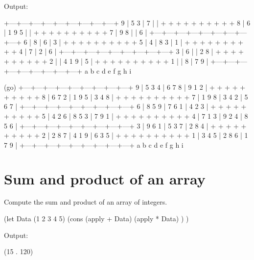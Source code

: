 \begin{wideverbatim}


Output:

   +---+---+---+---+---+---+---+---+---+
 9 | 5   3     |     7     |           |
   +   +   +   +   +   +   +   +   +   +
 8 | 6         | 1   9   5 |           |
   +   +   +   +   +   +   +   +   +   +
 7 |     9   8 |           |     6     |
   +---+---+---+---+---+---+---+---+---+
 6 | 8         |     6     |         3 |
   +   +   +   +   +   +   +   +   +   +
 5 | 4         | 8       3 |         1 |
   +   +   +   +   +   +   +   +   +   +
 4 | 7         |     2     |         6 |
   +---+---+---+---+---+---+---+---+---+
 3 |     6     |           | 2   8     |
   +   +   +   +   +   +   +   +   +   +
 2 |           | 4   1   9 |         5 |
   +   +   +   +   +   +   +   +   +   +
 1 |           |     8     |     7   9 |
   +---+---+---+---+---+---+---+---+---+
     a   b   c   d   e   f   g   h   i

(go)
   +---+---+---+---+---+---+---+---+---+
 9 | 5   3   4 | 6   7   8 | 9   1   2 |
   +   +   +   +   +   +   +   +   +   +
 8 | 6   7   2 | 1   9   5 | 3   4   8 |
   +   +   +   +   +   +   +   +   +   +
 7 | 1   9   8 | 3   4   2 | 5   6   7 |
   +---+---+---+---+---+---+---+---+---+
 6 | 8   5   9 | 7   6   1 | 4   2   3 |
   +   +   +   +   +   +   +   +   +   +
 5 | 4   2   6 | 8   5   3 | 7   9   1 |
   +   +   +   +   +   +   +   +   +   +
 4 | 7   1   3 | 9   2   4 | 8   5   6 |
   +---+---+---+---+---+---+---+---+---+
 3 | 9   6   1 | 5   3   7 | 2   8   4 |
   +   +   +   +   +   +   +   +   +   +
 2 | 2   8   7 | 4   1   9 | 6   3   5 |
   +   +   +   +   +   +   +   +   +   +
 1 | 3   4   5 | 2   8   6 | 1   7   9 |
   +---+---+---+---+---+---+---+---+---+
     a   b   c   d   e   f   g   h   i

\end{wideverbatim}

\pagebreak{}
\section*{Sum and product of an array}

Compute the sum and product of an array of integers.

\begin{wideverbatim}

(let Data (1 2 3 4 5)
   (cons
      (apply + Data)
      (apply * Data) ) )

Output:

(15 . 120)

\end{wideverbatim}

